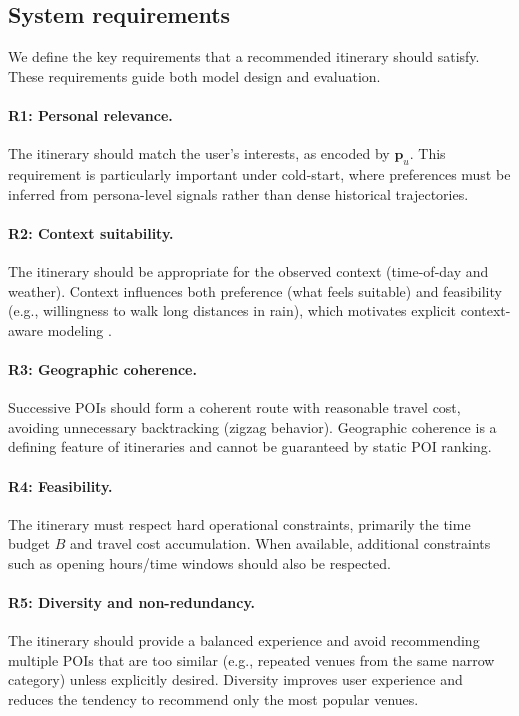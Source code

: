 \subsection{System requirements}
We define the key requirements that a recommended itinerary should satisfy. These requirements guide both model design and evaluation.

\paragraph{R1: Personal relevance.}
The itinerary should match the user's interests, as encoded by $\mathbf{p}_u$. This requirement is particularly important under cold-start, where preferences must be inferred from persona-level signals rather than dense historical trajectories.

\paragraph{R2: Context suitability.}
The itinerary should be appropriate for the observed context (time-of-day and weather). Context influences both preference (what feels suitable) and feasibility (e.g., willingness to walk long distances in rain), which motivates explicit context-aware modeling \citep{adomavicius2005tois, adomavicius2022cars}.

\paragraph{R3: Geographic coherence.}
Successive POIs should form a coherent route with reasonable travel cost, avoiding unnecessary backtracking (zigzag behavior). Geographic coherence is a defining feature of itineraries and cannot be guaranteed by static POI ranking.

\paragraph{R4: Feasibility.}
The itinerary must respect hard operational constraints, primarily the time budget $B$ and travel cost accumulation. When available, additional constraints such as opening hours/time windows should also be respected.

\paragraph{R5: Diversity and non-redundancy.}
The itinerary should provide a balanced experience and avoid recommending multiple POIs that are too similar (e.g., repeated venues from the same narrow category) unless explicitly desired. Diversity improves user experience and reduces the tendency to recommend only the most popular venues.

